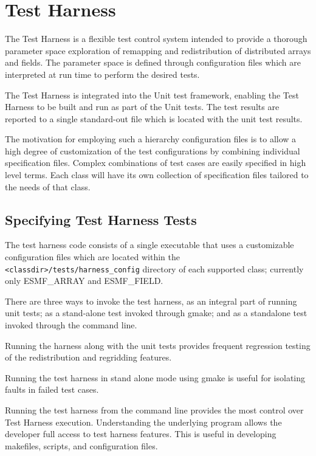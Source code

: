 \section{Test Harness}
\label{sec:harness}


The Test Harness is a flexible test control system intended to provide a thorough 
parameter space exploration of remapping and redistribution of distributed arrays and fields.
The parameter space is defined through configuration files which are interpreted at
run time to perform the desired tests.

The Test Harness is integrated into the Unit test framework, enabling
the Test Harness to be built and run as part of the Unit tests. The test results 
are reported to a single standard-out file which is located with the unit test 
results.

The motivation for employing such a hierarchy configuration files is to allow a 
high degree of customization of the test configurations by combining individual 
specification files. Complex combinations of test cases are easily specified in high level terms.
Each class will have its own collection of specification files tailored to the needs of that class.

\subsection{Specifying Test Harness Tests}
The test harness code consists of a single executable that uses a customizable configuration
files which are located within the \texttt{<classdir>/tests/harness\_config} directory of each 
supported class; currently only ESMF\_ARRAY and ESMF\_FIELD.

There are three ways to invoke the test harness, as an integral part of running unit
tests; as a stand-alone test invoked through gmake; and as a standalone test invoked through the command line.

Running the harness along with the unit tests provides
frequent regression testing of the redistribution and regridding features.  

Running the test harness
in stand alone mode using gmake is useful for isolating faults in failed test cases.  

Running the test harness from the command line provides the most control over Test Harness execution.
Understanding the underlying program allows the developer full access to test harness features.  
This is useful in developing makefiles, scripts, and configuration files. 


